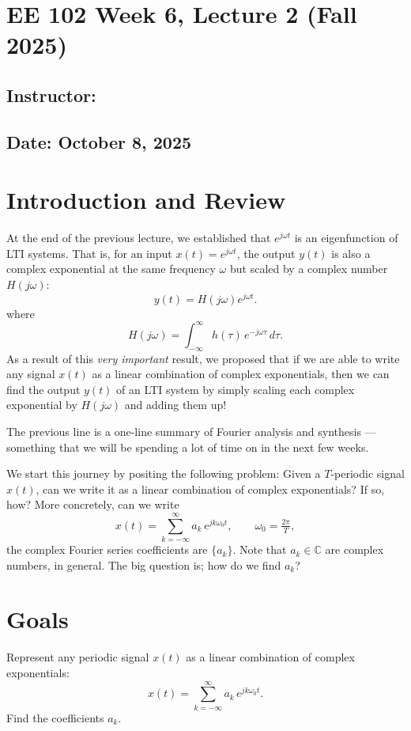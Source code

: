 \documentclass{ee102_notes}
\renewcommand{\releasedate}{October 8, 2025}
\begin{document}
\section*{EE 102 Week 6, Lecture 2 (Fall 2025)}
\subsection*{Instructor: \instructor}
\subsection*{Date: \releasedate}

\section{Introduction and Review}
At the end of the previous lecture, we established that $e^{j\omega t}$ is an eigenfunction of LTI systems. That is, for an input $x(t)=e^{j\omega t}$, the output $y(t)$ is also a complex exponential at the same frequency $\omega$ but scaled by a complex number $H(j\omega)$:
\[
y(t)=H(j\omega)e^{j\omega t}.
\]
where 
\[
H(j\omega)=\int_{-\infty}^{\infty} h(\tau)\,e^{-j\omega \tau}\,d\tau.
\]
As a result of this \emph{very important} result, we proposed that if we are able to write any signal $x(t)$ as a linear combination of complex exponentials, then we can find the output $y(t)$ of an LTI system by simply scaling each complex exponential by $H(j\omega)$ and adding them up! 

The previous line is a one-line summary of Fourier analysis and synthesis --- something that we will be spending a lot of time on in the next few weeks.

We start this journey by positing the following problem:  Given a $T$-periodic signal $x(t)$, can we write it as a linear combination of complex exponentials? If so, how? More concretely, can we write
\[
x(t)=\sum_{k=-\infty}^{\infty} a_k\,e^{jk\omega_0 t}, 
\qquad \omega_0=\tfrac{2\pi}{T},
\]
the complex Fourier series coefficients are $\{a_k\}$. Note that $a_k \in \mathbb{C}$ are complex numbers, in general. The big question is; how do we find $a_k$?

\section{Goals}
Represent any periodic signal $x(t)$ as a linear combination of complex exponentials:
\begin{equation}
x(t)=\sum_{k=-\infty}^{\infty} a_k\,e^{jk\omega_0 t}.
\label{eq:fourier-series}
\end{equation}
Find the coefficients $a_k$.
\end{document}
